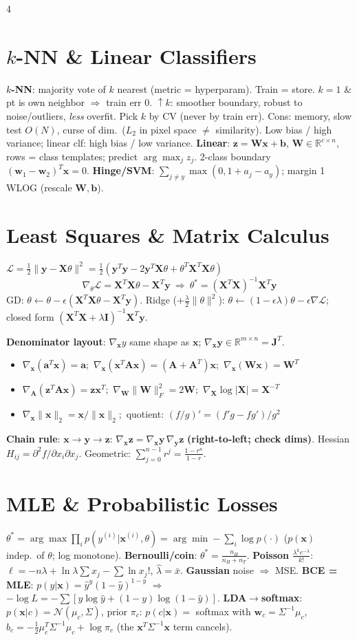 \documentclass[8pt,landscape]{extarticle}
\newcommand{\x}{\mathbf{x}}
\newcommand{\y}{\mathbf{y}}
\newcommand{\z}{\mathbf{z}}
\newcommand{\bb}{\mathbf{b}}
\newcommand{\W}{\mathbf{W}}
\newcommand{\w}{\mathbf{w}}
\newcommand{\X}{\mathbf{X}}
\newcommand{\A}{\mathbf{A}}
\newcommand{\R}{\mathbb{R}}
\newcommand{\key}[1]{\textbf{\color{BrickRed}#1}}
\begin{document}
\begin{multicols*}{4}
\section{$k$-NN \& Linear Classifiers}
\textbf{$k$-NN}: majority vote of $k$ nearest (metric = hyperparam). Train = store. $k{=}1$ \& pt is own neighbor $\Rightarrow$ train err 0. $\uparrow k$: smoother boundary, robust to noise/outliers, \emph{less} overfit. Pick $k$ by CV (never by train err). Cons: memory, slow test $O(N)$, curse of dim.\ ($L_2$ in pixel space $\ne$ similarity). Low bias / high variance; linear clf: high bias / low variance.
\textbf{Linear}: $\z=\W\x+\bb$, $\W\in\R^{c\times n}$, rows = class templates; predict $\arg\max_j z_j$. 2-class boundary $(\w_1-\w_2)^T\x=0$.
\textbf{Hinge/SVM}: $\sum_{j\ne y}\max(0,1+a_j-a_y)$; margin 1 WLOG (rescale $\W,\bb$).

\section{Least Squares \& Matrix Calculus}
$\mathcal L=\tfrac12\|\y-\X\theta\|^2=\tfrac12(\y^T\y-2\y^T\X\theta+\theta^T\X^T\X\theta)$
\[\nabla_\theta\mathcal L=\X^T\X\theta-\X^T\y\ \Rightarrow\ \theta^*=(\X^T\X)^{-1}\X^T\y\]
GD: $\theta\leftarrow\theta-\epsilon(\X^T\X\theta-\X^T\y)$. Ridge ($+\frac\lambda2\|\theta\|^2$): $\theta\leftarrow(1-\epsilon\lambda)\theta-\epsilon\nabla\mathcal L$; closed form $(\X^T\X+\lambda\mathbf I)^{-1}\X^T\y$.

\textbf{Denominator layout}: $\nabla_\x y$ same shape as $\x$; $\nabla_\x\y\in\R^{m\times n}=\mathbf J^T$.
\begin{itemize}
\item $\nabla_\x(\mathbf a^T\x)=\mathbf a$;\ $\nabla_\x(\x^T\A\x)=(\A+\A^T)\x$;\ $\nabla_\x(\W\x)=\W^T$
\item $\nabla_\A(\z^T\A\x)=\z\x^T$;\ $\nabla_\W\|\W\|_F^2=2\W$;\ $\nabla_\X\log|\X|=\X^{-T}$
\item $\nabla_\x\|\x\|_2=\x/\|\x\|_2$;\ quotient: $(f/g)'=(f'g-fg')/g^2$
\end{itemize}
\textbf{Chain rule}: $\x\to\y\to\z$: $\nabla_\x\z=\nabla_\x\y\,\nabla_\y\z$ \key{(right-to-left; check dims)}. Hessian $H_{ij}=\partial^2f/\partial x_i\partial x_j$.
Geometric: $\sum_{j=0}^{n-1}r^j=\frac{1-r^n}{1-r}$.

\section{MLE \& Probabilistic Losses}
$\theta^*=\arg\max\prod_i p(y^{(i)}|\x^{(i)},\theta)=\arg\min-\sum_i\log p(\cdot)$ ($p(\x)$ indep.\ of $\theta$; log monotone).
\textbf{Bernoulli/coin}: $\theta^*=\frac{n_H}{n_H+n_T}$. \textbf{Poisson} $\frac{\lambda^ke^{-\lambda}}{k!}$: $\ell=-n\lambda+\ln\lambda\sum x_j-\sum\ln x_j!$, $\hat\lambda=\bar x$. \textbf{Gaussian} noise $\Rightarrow$ MSE.
\textbf{BCE = MLE}: $p(y|\x)=\hat y^{y}(1-\hat y)^{1-y}$ $\Rightarrow$ $-\log L=-\sum[y\log\hat y+(1-y)\log(1-\hat y)]$.
\textbf{LDA$\to$softmax}: $p(\x|c)=\mathcal N(\mu_c,\Sigma)$, prior $\pi_c$: $p(c|\x)=$ softmax with $\w_c=\Sigma^{-1}\mu_c$, $b_c=-\frac12\mu_c^T\Sigma^{-1}\mu_c+\log\pi_c$ (the $\x^T\Sigma^{-1}\x$ term cancels).


\end{multicols*}
\end{document}
